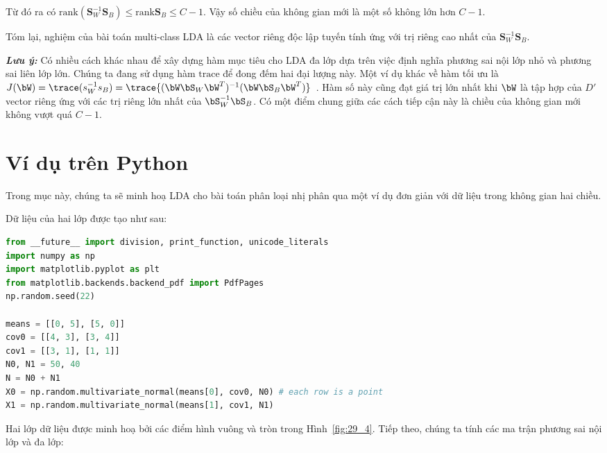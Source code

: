  
 
Từ đó ra có $\text{rank}\left(\mathbf{S}_W^{-1} \mathbf{S}_B\right) \leq
\text{rank}\mathbf{S}_B \leq C - 1$. Vậy số chiều của không gian mới là một số
không lớn hơn $C-1$.
 
Tóm lại, nghiệm của bài toán multi-class LDA là các vector riêng độc lập tuyến tính ứng với trị riêng cao nhất của $\mathbf{S}_W^{-1} \mathbf{S}_B$. 
 
\textit{\textbf{Lưu ý:}} Có nhiều cách khác nhau để xây dựng hàm mục tiêu cho LDA đa lớp dựa trên việc định nghĩa phương sai nội lớp nhỏ và phương sai liên lớp lớn. Chúng ta đang sử dụng hàm $\text{trace}$ để đong đếm hai đại lượng này.
Một ví dụ khác về hàm tối ưu là $J(\bW) = \trace(s_W^{-1}s_B) =
\trace\{(\bW\bS_W\bW^T)^{-1}(\bW\bS_B\bW^T)\}$~\cite{fukunaga2013introduction}.
Hàm số này cũng đạt giá trị lớn nhất khi $\bW$ là tập hợp của $D'$ vector riêng
ứng với các trị riêng lớn nhất của $\bS_W^{-1}\bS_B$. Có một điểm chung giữa các
cách tiếp cận này là chiều của không gian mới không vượt quá $C-1$.
 
 
\section{Ví dụ trên Python}
\label{sec:29_4}
Trong mục này, chúng ta sẽ minh hoạ LDA cho bài toán phân loại nhị phân qua một
ví dụ đơn giản với dữ liệu trong không gian hai chiều. 
 
Dữ liệu của hai lớp được tạo như sau: 
\begin{lstlisting}[language=Python]
from __future__ import division, print_function, unicode_literals 
import numpy as np 
import matplotlib.pyplot as plt 
from matplotlib.backends.backend_pdf import PdfPages 
np.random.seed(22) 
 
means = [[0, 5], [5, 0]] 
cov0 = [[4, 3], [3, 4]] 
cov1 = [[3, 1], [1, 1]] 
N0, N1 = 50, 40
N = N0 + N1 
X0 = np.random.multivariate_normal(means[0], cov0, N0) # each row is a point 
X1 = np.random.multivariate_normal(means[1], cov1, N1) 
\end{lstlisting}
 
Hai lớp dữ liệu được minh hoạ bởi các điểm hình vuông và tròn trong Hình~\ref{fig:29_4}.
Tiếp theo, chúng ta tính các ma trận phương sai nội lớp và đa lớp:
 
